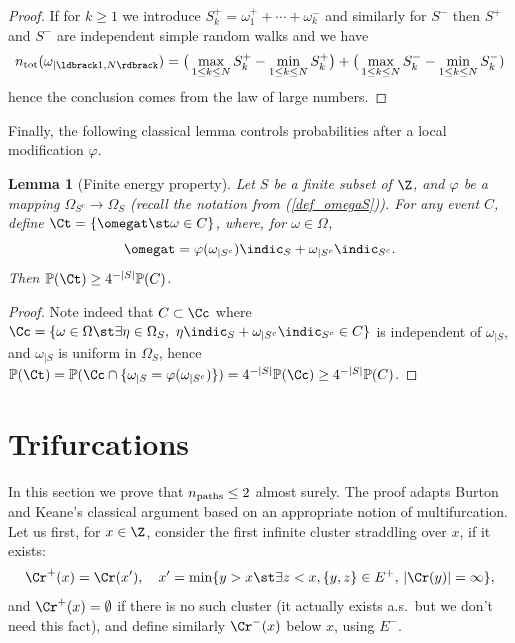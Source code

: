 \documentclass[12pt]{amsart}
\newcommand{\prob}{\mathbb{P}}
\newcommand{\npath}{n_{\rm paths}}
\newtheorem{lemma}{Lemma}
\theoremstyle{remark}
\newcommand{\Li}{\ldbrack} %
\newcommand{\Ri}{\rdbrack}
\begin{document}
\begin{proof} If for $k \geq 1$ we introduce $S_{k}^{+} = \omega^{+}_{1} + \cdots + \omega^{-}_{k}$ and similarly for $S^{-}$ then $S^{+}$ and $S^{-}$ are independent simple random walks and we have 
\[\ntot(\omega_{|\Li1,N\Ri})=\big(
\max_{1\le k\le N}S^+_k-\min_{1\le k\le N} S^+_k\big)+\big(
\max_{1\le k\le N}S^-_k-\min_{1\le k\le N} S^-_k)  \]
hence the conclusion comes from the law of large numbers.
\end{proof}


Finally, the following classical lemma controls probabilities after a local modification $\varphi$. 

\begin{lemma}[Finite energy property]\label{lem:finite_energy}
Let $S$ be a finite subset of $\Z$, and $\varphi$ be a mapping $\Omega_{S^c}\to\Omega_S$ (recall the notation from (\ref{def_omegaS})). For any event $C$, define
$\Ct=\{\omegat\st \omega\in C\}$,
where, for $\omega\in\Omega$, 
\[\omegat=\varphi(\omega_{|S^c})\indic_S+\omega_{|S^c}\indic_{S^c}.\] 
Then $\prob(\Ct)\ge 4^{-|S|}\prob(C)$. 
\end{lemma}

\begin{proof}
Note indeed that $C\subset\Cc$ where $\Cc=\{\omega\in\Omega\st \exists\eta\in\Omega_S,\ \eta\indic_S+\omega_{|S^c}\indic_{S^c}\in C\}$ is independent of $\omega_{|S}$, and $\omega_{|S}$ is uniform in $\Omega_S$, hence
$\prob(\Ct)=\prob(\Cc\cap\{\omega_{|S}=\varphi(\omega_{|S^c})\})=4^{-|S|}\prob(\Cc)\ge4^{-|S|}\prob(C)$.
\end{proof}



\section{Trifurcations}\label{sec:trifu}

In this section we prove that $\npath\le 2$ almost surely. The proof adapts Burton and Keane's classical argument based on an appropriate notion of multifurcation.  Let us first, for $x\in\Z$, consider the first infinite cluster straddling over $x$, if it exists:
\[\Cr^+(x)=\Cr(x'),\quad x'=\min\{y>x\st \exists z<x, \{y,z\}\in E^+,\,|\Cr(y)|=\infty\},\] 
and $\Cr^+(x)=\emptyset$ if there is no such cluster (it actually exists a.s.\ but we don't need this fact), and define similarly $\Cr^-(x)$ below $x$, using $E^-$. 
\end{document}
